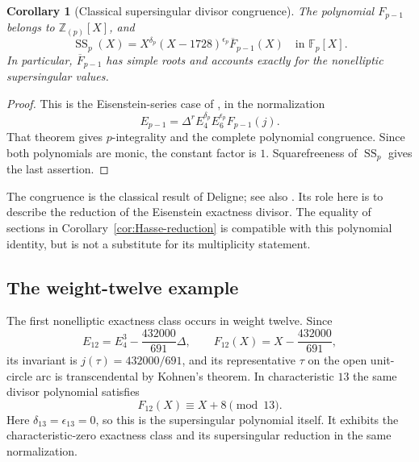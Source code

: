 \documentclass[11pt]{amsart}
\newtheorem{cor}[thm]{Corollary}
\theoremstyle{definition}
\theoremstyle{remark}
\numberwithin{equation}{section}
\begin{document}
\begin{cor}[Classical supersingular divisor congruence]
\label{cor:supersingular-polynomial}
The polynomial $F_{p-1}$ belongs to $\mathbb Z_{(p)}[X]$, and
\begin{equation}\label{eq:supersingular-polynomial}
\operatorname{SS}_p(X)
=X^{\delta_p}(X-1728)^{\epsilon_p}\overline F_{p-1}(X)
\quad\text{in }\mathbb F_p[X].
\end{equation}
In particular, $\overline F_{p-1}$ has simple roots and accounts
exactly for the nonelliptic supersingular values.
\end{cor}

\begin{proof}
This is the Eisenstein-series case of \cite[Theorem~1]{kz-ss}, in the
normalization
\[
E_{p-1}=\Delta^r E_4^{\delta_p}E_6^{\epsilon_p}F_{p-1}(j).
\]
That theorem gives $p$-integrality and the complete polynomial
congruence. Since both polynomials are monic, the constant factor is
$1$. Squarefreeness of $\operatorname{SS}_p$ gives the last assertion.
\end{proof}

The congruence is the classical result of Deligne; see also
\cite{gomez-lakein-larsen}. Its role here is to describe the reduction
of the Eisenstein exactness divisor. The equality of sections in
Corollary~\ref{cor:Hasse-reduction} is compatible with this polynomial
identity, but is not a substitute for its multiplicity statement.

\subsection{The weight-twelve example}

The first nonelliptic exactness class occurs in weight twelve. Since
\[
E_{12}=E_4^3-\frac{432000}{691}\Delta,
\qquad F_{12}(X)=X-\frac{432000}{691},
\]
its invariant is $j(\tau)=432000/691$, and its representative $\tau$
on the open unit-circle arc is transcendental by Kohnen's theorem.
In characteristic $13$ the same divisor polynomial satisfies
\[
F_{12}(X)\equiv X+8\pmod{13}.
\]
Here $\delta_{13}=\epsilon_{13}=0$, so this is the supersingular
polynomial itself. It exhibits the characteristic-zero exactness
class and its supersingular reduction in the same normalization.


\raggedbottom
\end{document}

